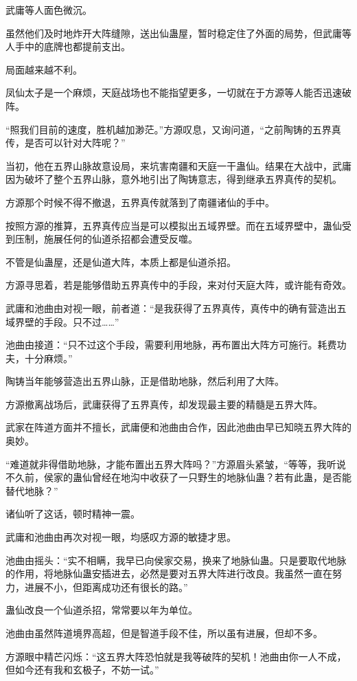 \begin{this_body}
武庸等人面色微沉。

虽然他们及时地炸开大阵缝隙，送出仙蛊屋，暂时稳定住了外面的局势，但武庸等人手中的底牌也都提前支出。

局面越来越不利。

凤仙太子是一个麻烦，天庭战场也不能指望更多，一切就在于方源等人能否迅速破阵。

“照我们目前的速度，胜机越加渺茫。”方源叹息，又询问道，“之前陶铸的五界真传，是否可以针对大阵呢？”

当初，他在五界山脉故意设局，来坑害南疆和天庭一干蛊仙。结果在大战中，武庸因为破坏了整个五界山脉，意外地引出了陶铸意志，得到继承五界真传的契机。

方源那个时候不得不撤退，五界真传就落到了南疆诸仙的手中。

按照方源的推算，五界真传应当是可以模拟出五域界壁。而在五域界壁中，蛊仙受到压制，施展任何的仙道杀招都会遭受反噬。

不管是仙蛊屋，还是仙道大阵，本质上都是仙道杀招。

方源寻思着，若是能够借助五界真传中的手段，来对付天庭大阵，或许能有奇效。

武庸和池曲由对视一眼，前者道：“是我获得了五界真传，真传中的确有营造出五域界壁的手段。只不过……”

池曲由接道：“只不过这个手段，需要利用地脉，再布置出大阵方可施行。耗费功夫，十分麻烦。”

陶铸当年能够营造出五界山脉，正是借助地脉，然后利用了大阵。

方源撤离战场后，武庸获得了五界真传，却发现最主要的精髓是五界大阵。

武家在阵道方面并不擅长，武庸便和池曲由合作，因此池曲由早已知晓五界大阵的奥妙。

“难道就非得借助地脉，才能布置出五界大阵吗？”方源眉头紧皱，“等等，我听说不久前，侯家的蛊仙曾经在地沟中收获了一只野生的地脉仙蛊？若有此蛊，是否能替代地脉？”

诸仙听了这话，顿时精神一震。

武庸和池曲由再次对视一眼，均感叹方源的敏捷才思。

池曲由摇头：“实不相瞒，我早已向侯家交易，换来了地脉仙蛊。只是要取代地脉的作用，将地脉仙蛊安插进去，必然是要对五界大阵进行改良。我虽然一直在努力，进展不小，但距离成功还有很长的路。”

蛊仙改良一个仙道杀招，常常要以年为单位。

池曲由虽然阵道境界高超，但是智道手段不佳，所以虽有进展，但却不多。

方源眼中精芒闪烁：“这五界大阵恐怕就是我等破阵的契机！池曲由你一人不成，但如今还有我和玄极子，不妨一试。”

\end{this_body}


